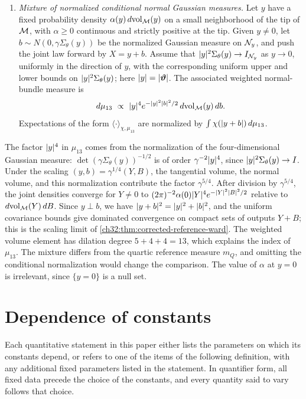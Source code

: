 \begin{definition}
\begin{enumerate}
\item \emph{Mixture of normalized conditional normal Gaussian measures.} Let $y$ have a fixed probability density $\alpha(y)\,d\mathrm{vol}_{\mathcal M}(y)$ on a small neighborhood of the tip of $\mathcal M$, with $\alpha\ge0$ continuous and strictly positive at the tip. Given $y\ne0$, let $b\sim N(0,\gamma\Sigma_\theta(y))$ be the normalized Gaussian measure on $\mathcal N_{y}$, and push the joint law forward by $X=y+b$. Assume that $\lvert y\rvert^2\Sigma_\theta(y)\to I_{\mathcal N_{y}}$ as $y\to0$, uniformly in the direction of $y$, with the corresponding uniform upper and lower bounds on $\lvert y\rvert^2\Sigma_\theta(y)$; here $\lvert y\rvert=\lvert \bm\vartheta\rvert$. The associated weighted normal-bundle measure is
\[
 d\mu_{13}\ \propto\ \lvert y\rvert^4e^{-\lvert y\rvert^2\lvert b\rvert^2/2}\,d\mathrm{vol}_{\mathcal M}(y)\,db.
\]
Expectations of the form $\langle\cdot\rangle_{\chi,\mu_{13}}$ are normalized by $\int\chi(\lvert y+b\rvert)\,d\mu_{13}$.
\end{enumerate}
\end{definition}

The factor $\lvert y\rvert^4$ in $\mu_{13}$ comes from the normalization of the four-dimensional Gaussian measure: $\det(\gamma\Sigma_\theta(y))^{-1/2}$ is of order $\gamma^{-2}\lvert y\rvert^4$, since $\lvert y\rvert^2\Sigma_\theta(y)\to I$. Under the scaling $(y,b)=\gamma^{1/4}(Y,B)$, the tangential volume, the normal volume, and this normalization contribute the factor $\gamma^{5/4}$. After division by $\gamma^{5/4}$, the joint densities converge for $Y\ne0$ to $(2\pi)^{-2}\alpha(0)\lvert Y\rvert^4e^{-\lvert Y\rvert^2\lvert B\rvert^2/2}$ relative to $d\mathrm{vol}_{\mathcal M}(Y)\,dB$. Since $y\perp b$, we have $\lvert y+b\rvert^2=\lvert y\rvert^2+\lvert b\rvert^2$, and the uniform covariance bounds give dominated convergence on compact sets of outputs $Y+B$; this is the scaling limit of \cref{ch32:thm:corrected-reference-ward}. The weighted volume element has dilation degree $5+4+4=13$, which explains the index of $\mu_{13}$. The mixture differs from the quartic reference measure $m_Q$, and omitting the conditional normalization would change the comparison. The value of $\alpha$ at $y=0$ is irrelevant, since $\{y=0\}$ is a null set.

\section{Dependence of constants}\label{ch01:sec:constants}

Each quantitative statement in this paper either lists the parameters on which its constants depend, or refers to one of the items of the following definition, with any additional fixed parameters listed in the statement. In quantifier form, all fixed data precede the choice of the constants, and every quantity said to vary follows that choice.

